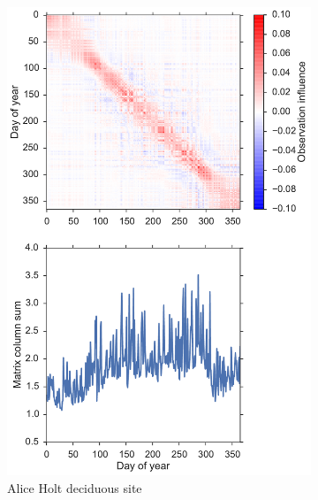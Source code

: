 \begin{figure}[ht]
    \centering
    \begin{subfigure}[b]{0.46\textwidth}
        \includegraphics[width=\textwidth]{chapter/chapter5/inf_mat_sa.pdf}
        \caption{Alice Holt deciduous site}
        \label{chap5:fig:ah_inf_mat}
    \end{subfigure}%
    \begin{subfigure}[b]{0.46\textwidth}

\end{subfigure}
\end{figure}
